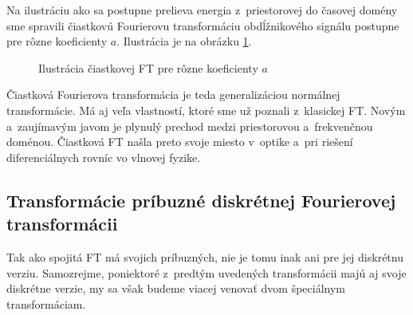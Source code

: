 Na ilustráciu ako sa postupne prelieva energia z~priestorovej do
časovej domény sme spravili čiastkovú Fourierovu transformáciu
obdĺžnikového signálu postupne pre rôzne koeficienty $a$. Ilustrácia
je na obrázku \ref{fig:fractional_fourier_transform}.

\begin{figure}[htp]
    \def\imagepath{obrazky/transformacia/fractional_fourier_transform}
    \centering
    \label{fig:fractional_fourier_transform}
    \caption{Ilustrácia čiastkovej FT pre rôzne koeficienty $a$}
\end{figure}

Čiastková Fourierova transformácia je teda generalizáciou normálnej
transformácie. Má aj veľa vlastností, ktoré sme už poznali z~klasickej
FT. Novým a~zaujímavým javom je plynulý prechod medzi
priestorovou a~frekvenčnou doménou. Čiastková FT našla preto svoje
miesto v~optike a~pri riešení diferenciálnych
rovníc vo vlnovej fyzike.

\subsection{Transformácie príbuzné diskrétnej Fourierovej
transformácii}
Tak ako spojitá FT má svojich príbuzných, nie je tomu inak ani pre jej
diskrétnu verziu. Samozrejme, poniektoré z~predtým uvedených
transformácii majú aj svoje diskrétne verzie, my sa však budeme viacej
venovať dvom špeciálnym transformáciam.

